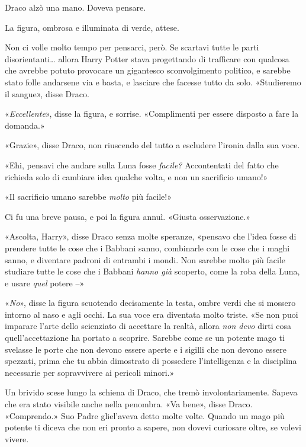 Draco alzò una mano. Doveva pensare.

La figura, ombrosa e illuminata di verde, attese.

Non ci volle molto tempo per pensarci, però. Se scartavi tutte le parti disorientanti… allora Harry Potter stava progettando di trafficare con qualcosa che avrebbe potuto provocare un gigantesco sconvolgimento politico, e sarebbe stato folle andarsene via e basta, e lasciare che facesse tutto da solo. «Studieremo il sangue», disse Draco.

«\textit{Eccellente}», disse la figura, e sorrise. «Complimenti per essere disposto a fare la domanda.»

«Grazie», disse Draco, non riuscendo del tutto a escludere l’ironia dalla sua voce.

«Ehi, pensavi che andare sulla Luna fosse \textit{facile?} Accontentati del fatto che richieda solo di cambiare idea qualche volta, e non un sacrificio umano!»

«Il sacrificio umano sarebbe \textit{molto} più facile!»

Ci fu una breve pausa, e poi la figura annuì. «Giusta osservazione.»

«Ascolta, Harry», disse Draco senza molte speranze, «pensavo che l’idea fosse di prendere tutte le cose che i Babbani sanno, combinarle con le cose che i maghi sanno, e diventare padroni di entrambi i mondi. Non sarebbe molto più facile studiare tutte le cose che i Babbani \textit{hanno già} scoperto, come la roba della Luna, e usare \textit{quel} potere –»

«\textit{No}», disse la figura scuotendo decisamente la testa, ombre verdi che si mossero intorno al naso e agli occhi. La sua voce era diventata molto triste. «Se non puoi imparare l’arte dello scienziato di accettare la realtà, allora \textit{non devo} dirti cosa quell’accettazione ha portato a scoprire. Sarebbe come se un potente mago ti svelasse le porte che non devono essere aperte e i sigilli che non devono essere spezzati, prima che tu abbia dimostrato di possedere l’intelligenza e la disciplina necessarie per sopravvivere ai pericoli minori.»

Un brivido scese lungo la schiena di Draco, che tremò involontariamente. Sapeva che era stato visibile anche nella penombra. «Va bene», disse Draco. «Comprendo.» Suo Padre gliel’aveva detto molte volte. Quando un mago più potente ti diceva che non eri pronto a sapere, non dovevi curiosare oltre, se volevi vivere.

